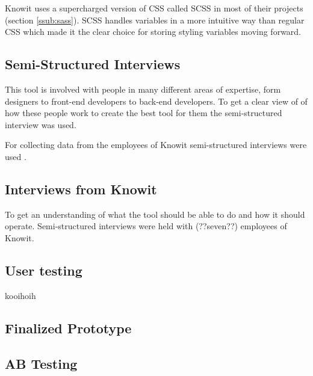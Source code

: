 Knowit uses a supercharged version of CSS called SCSS in most of their projects (section \ref{ssub:sass}). SCSS handles variables in a more intuitive way than regular  CSS which made it the clear choice for storing styling variables moving forward.






\subsection{Semi-Structured Interviews}%
\label{sub:inteviews}
This tool is involved with people in many different areas of expertise, form designers to front-end developers to back-end developers. To get a clear view of of how these people work to create the best tool for them the semi-structured interview was used. 

For collecting data from the employees of Knowit semi-structured interviews were used \cite{galletta2013mastering}. 


\subsection{Interviews from Knowit}%
\label{sub:}
To get an understanding of what the tool should be able to do and how it should operate. Semi-structured interviews were held with (??seven??) employees of Knowit.


\subsection{User testing}%
\label{sub:userTesting}

kooihoih
\subsection{ Finalized Prototype }%
\label{sub:finalizingPrototype}

\subsection{ AB Testing }%
\label{sub:mABTesting}
